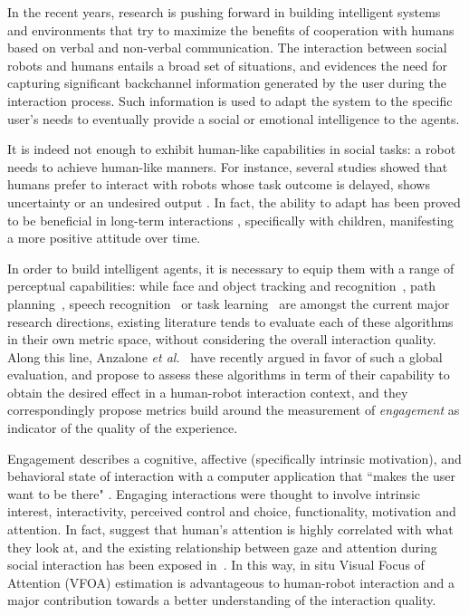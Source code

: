 \documentclass{sig-alternate}
\newcommand{\etal}{\textit{et al.}\xspace}
\begin{document}
In the recent years, research is pushing forward in building intelligent systems
and environments that try to maximize the benefits of cooperation with humans
based on verbal and non-verbal communication. The interaction between social
robots and humans entails a broad set of situations, and evidences the need for
capturing significant backchannel information generated by the user during the
interaction process. Such information is used to adapt the system to the
specific user's needs to eventually provide a social or emotional intelligence
to the agents.

It is indeed not enough to exhibit human-like capabilities in social tasks: a
robot needs to achieve human-like manners. For instance, several studies showed
that humans prefer to interact with robots whose task outcome is delayed, shows
uncertainty or an undesired output \cite{Admoni,Short}. In fact, the ability to
adapt has been proved to be beneficial in long-term interactions
\cite{Tielman:2014, Lim:2014}, specifically with children, manifesting a more
positive attitude over time.

In order to build intelligent agents, it is necessary to equip them with a range
of perceptual capabilities: while face and object tracking and
recognition~\cite{Zhao:2003, Jafri:2014}, path planning~\cite{Galceran:2013},
speech recognition~\cite{brick2007incremental} or task
learning~\cite{calinon2007learning} are amongst the current major research
directions, existing literature tends to evaluate each of these algorithms in
their own metric space, without considering the overall interaction quality.
Along this line, Anzalone \etal~\cite{anzalone} have recently argued in favor of
such a global evaluation, and propose to assess these algorithms in term of
their capability to obtain the desired effect in a human-robot interaction
context, and they correspondingly propose metrics build around the measurement
of \emph{engagement} as indicator of the quality of the experience.

Engagement describes a cognitive, affective (specifically intrinsic motivation),
and behavioral state of interaction with a computer application that ``makes the
user want to be there" \cite{OBrien:2010}. Engaging interactions were thought to
involve intrinsic interest, interactivity, perceived control and choice,
functionality, motivation and attention. In fact,
\cite{yarbus1967eye,barber1976perception} suggest that human's attention is
highly correlated with what they look at, and the existing relationship between
gaze and attention during social interaction has been exposed
in~\cite{argyle1969social}. In this way, in situ Visual Focus of Attention
(VFOA) estimation is advantageous to human-robot interaction and a major
contribution towards a better understanding of the interaction quality.
\end{document}
